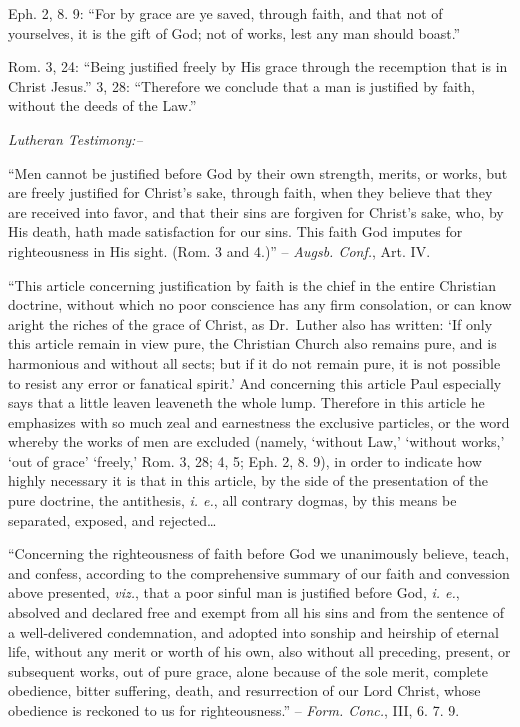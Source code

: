 \documentclass[
]{book}
\begin{document}
Eph. 2, 8. 9: ``For by grace are ye saved, through faith, and that not of yourselves, it is the gift of God; not of works, lest any man should boast.''

Rom. 3, 24: ``Being justified freely by His grace through the recemption that is in Christ Jesus.'' 3, 28: ``Therefore we conclude that a man is justified by faith, without the deeds of the Law.''

\begin{center}
\textsl{Lutheran Testimony:--}
\end{center}

``Men cannot be justified before God by their own strength, merits, or works, but are freely justified for Christ's sake, through faith, when they believe that they are received into favor, and that their sins are forgiven for Christ's sake, who, by His death, hath made satisfaction for our sins. This faith God imputes for righteousness in His sight. (Rom. 3 and 4.)'' -- \emph{Augsb. Conf.}, Art. IV.

``This article concerning justification by faith is the chief in the entire Christian doctrine, without which no poor conscience has any firm consolation, or can know aright the riches of the grace of Christ, as Dr.~Luther also has written: `If only this article remain in view pure, the Christian Church also remains pure, and is harmonious and without all sects; but if it do not remain pure, it is not possible to resist any error or fanatical spirit.' And concerning this article Paul especially says that a little leaven leaveneth the whole lump. Therefore in this article he emphasizes with so much zeal and earnestness the exclusive particles, or the word whereby the works of men are excluded (namely, `without Law,' `without works,' `out of grace' `freely,' Rom. 3, 28; 4, 5; Eph. 2, 8. 9), in order to indicate how highly necessary it is that in this article, by the side of the presentation of the pure doctrine, the antithesis, \emph{i. e.}, all contrary dogmas, by this means be separated, exposed, and rejected\ldots{}

``Concerning the righteousness of faith before God we unanimously believe, teach, and confess, according to the comprehensive summary of our faith and convession above presented, \emph{viz.}, that a poor sinful man is justified before God, \emph{i. e.}, absolved and declared free and exempt from all his sins and from the sentence of a well-delivered condemnation, and adopted into sonship and heirship of eternal life, without any merit or worth of his own, also without all preceding, present, or subsequent works, out of pure grace, alone because of the sole merit, complete obedience, bitter suffering, death, and resurrection of our Lord Christ, whose obedience is reckoned to us for righteousness.'' -- \emph{Form. Conc.}, III, 6. 7. 9.
\end{document}
